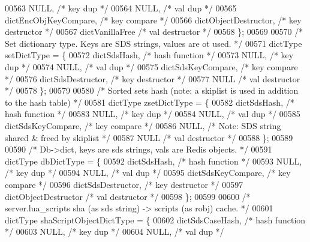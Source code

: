\begin{DoxyCode}
{{{{{00563     NULL,                      \textcolor{comment}{/* key dup */}
00564     NULL,                      \textcolor{comment}{/* val dup */}
00565     dictEncObjKeyCompare,      \textcolor{comment}{/* key compare */}
00566     dictObjectDestructor,      \textcolor{comment}{/* key destructor */}
00567     dictVanillaFree            \textcolor{comment}{/* val destructor */}
00568 \};
00569 
00570 \textcolor{comment}{/* Set dictionary type. Keys are SDS strings, values are ot used. */}
00571 dictType setDictType = \{
00572     dictSdsHash,               \textcolor{comment}{/* hash function */}
00573     NULL,                      \textcolor{comment}{/* key dup */}
00574     NULL,                      \textcolor{comment}{/* val dup */}
00575     dictSdsKeyCompare,         \textcolor{comment}{/* key compare */}
00576     dictSdsDestructor,         \textcolor{comment}{/* key destructor */}
00577     NULL                       \textcolor{comment}{/* val destructor */}
00578 \};
00579 
00580 \textcolor{comment}{/* Sorted sets hash (note: a skiplist is used in addition to the hash table) */}
00581 dictType zsetDictType = \{
00582     dictSdsHash,               \textcolor{comment}{/* hash function */}
00583     NULL,                      \textcolor{comment}{/* key dup */}
00584     NULL,                      \textcolor{comment}{/* val dup */}
00585     dictSdsKeyCompare,         \textcolor{comment}{/* key compare */}
00586     NULL,                      \textcolor{comment}{/* Note: SDS string shared & freed by skiplist */}
00587     NULL                       \textcolor{comment}{/* val destructor */}
00588 \};
00589 
00590 \textcolor{comment}{/* Db->dict, keys are sds strings, vals are Redis objects. */}
00591 dictType dbDictType = \{
00592     dictSdsHash,                \textcolor{comment}{/* hash function */}
00593     NULL,                       \textcolor{comment}{/* key dup */}
00594     NULL,                       \textcolor{comment}{/* val dup */}
00595     dictSdsKeyCompare,          \textcolor{comment}{/* key compare */}
00596     dictSdsDestructor,          \textcolor{comment}{/* key destructor */}
00597     dictObjectDestructor   \textcolor{comment}{/* val destructor */}
00598 \};
00599 
00600 \textcolor{comment}{/* server.lua\_scripts sha (as sds string) -> scripts (as robj) cache. */}
00601 dictType shaScriptObjectDictType = \{
00602     dictSdsCaseHash,            \textcolor{comment}{/* hash function */}
00603     NULL,                       \textcolor{comment}{/* key dup */}
00604     NULL,                       \textcolor{comment}{/* val dup */}
}}}}}
\end{DoxyCode}
